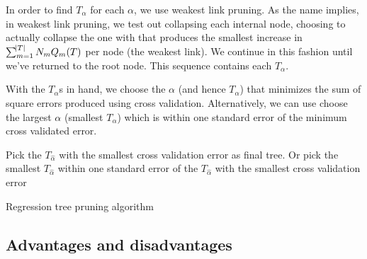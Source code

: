 \documentclass[12pt]{article}
\begin{document}
In order to find $T_{\alpha}$ for each $\alpha$, we use weakest link pruning. As the name implies, in weakest link pruning, we test out collapsing each internal node, choosing to actually collapse the one with that produces the smallest increase in $\sum_{m = 1}^{\abs{T}} N_{m} Q_{m}(T)$ per node (the weakest link). We continue in this fashion until we've returned to the root node. This sequence contains each $T_{\alpha}$. 

With the $T_{\alpha}$s in hand, we choose the $\alpha$ (and hence $T_{\alpha}$) that minimizes the sum of square errors produced using cross validation. Alternatively, we can use choose the largest $\alpha$ (smallest $T_{\alpha}$) which is within one standard error of the minimum cross validated error.

\begin{algorithm}[H]
Pick the $T_{\hat{\alpha}}$ with the smallest cross validation error as final tree. 
Or pick the smallest $T_{\hat{\alpha}}$ within one standard error of the $T_{\hat{\alpha}}$ with the smallest cross validation error
 \caption{Regression tree pruning algorithm}
\end{algorithm}



%
%


\subsection{Advantages and disadvantages} %
\label{sub:advantages_and_disadvantages_to_cart}
\end{document}

